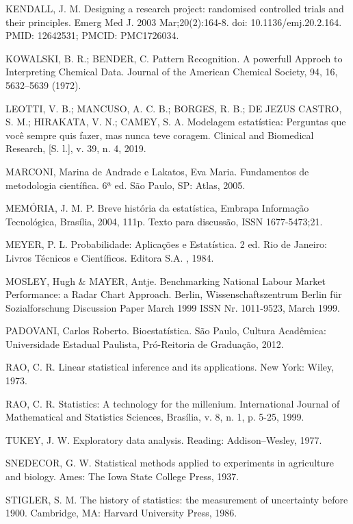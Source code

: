 KENDALL, J. M. Designing a research project: randomised controlled trials and their principles. Emerg Med J. 2003 Mar;20(2):164-8. doi: 10.1136/emj.20.2.164. PMID: 12642531; PMCID: PMC1726034.\vskip0.3cm

KOWALSKI, B. R.; BENDER, C. Pattern Recognition. A powerfull Approch to Interpreting Chemical Data. Journal of the American Chemical Society, 94, 16, 5632–5639 (1972).\vskip0.3cm



LEOTTI, V. B.; MANCUSO, A. C. B.; BORGES, R. B.; DE JEZUS CASTRO, S. M.; HIRAKATA, V. N.; CAMEY, S. A. Modelagem estatística: Perguntas que você sempre quis fazer, mas nunca teve coragem. Clinical and Biomedical Research, [S. l.], v. 39, n. 4, 2019.\vskip0.3cm


MARCONI, Marina de Andrade e Lakatos, Eva Maria. Fundamentos de metodologia científica. 6ª ed. São Paulo, SP: Atlas, 2005.\vskip0.3cm

MEMÓRIA, J. M. P. Breve história da estatística, Embrapa Informação Tecnológica, Brasília, 2004, 111p. Texto para discussão, ISSN 1677-5473;21. \vskip0.3cm

MEYER, P. L. Probabilidade: Aplicações e Estatística. 2 ed.
Rio de Janeiro: Livros Técnicos e Científicos. Editora S.A. ,
1984.\vskip0.3cm


MOSLEY, Hugh \& MAYER, Antje. Benchmarking National Labour Market
Performance: a Radar Chart Approach. Berlin, Wissenschaftszentrum Berlin
für Sozialforschung Discussion Paper March 1999 ISSN Nr. 1011-9523, March
1999.\vskip0.3cm


PADOVANI, Carlos Roberto. Bioestatística. São Paulo, Cultura Acadêmica:
Universidade Estadual Paulista, Pró-Reitoria de Graduação, 2012.\vskip0.3cm

RAO, C. R. Linear statistical inference and its applications. New York: Wiley, 1973.\vskip0.3cm

RAO, C. R. Statistics: A technology for the millenium. International Journal of Mathematical and Statistics Sciences, Brasília, v. 8, n. 1, p. 5-25, 1999.\vskip0.3cm

TUKEY, J. W. Exploratory data analysis. Reading: Addison–Wesley, 1977.\vskip0.3cm

SNEDECOR, G. W. Statistical methods applied to experiments in agriculture and biology. Ames: The Iowa State College Press, 1937. \vskip0.3cm

STIGLER, S. M. The history of statistics: the measurement of uncertainty before 1900. Cambridge, MA: Harvard University Press, 1986. \vskip0.3cm

